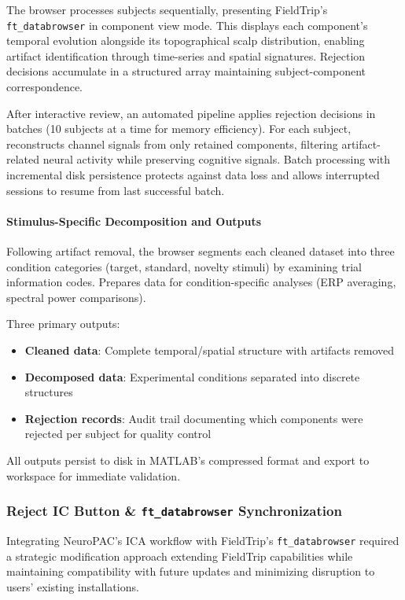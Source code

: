 \documentclass[12pt]{report}
\begin{document}
The browser processes subjects sequentially, presenting FieldTrip's \verb|ft_databrowser| in component view mode. This displays each component's temporal evolution alongside its topographical scalp distribution, enabling artifact identification through time-series and spatial signatures. Rejection decisions accumulate in a structured array maintaining subject-component correspondence.

After interactive review, an automated pipeline applies rejection decisions in batches (10 subjects at a time for memory efficiency). For each subject, reconstructs channel signals from only retained components, filtering artifact-related neural activity while preserving cognitive signals. Batch processing with incremental disk persistence protects against data loss and allows interrupted sessions to resume from last successful batch.

\paragraph{Stimulus-Specific Decomposition and Outputs}\mbox{}

Following artifact removal, the browser segments each cleaned dataset into three condition categories (target, standard, novelty stimuli) by examining trial information codes. Prepares data for condition-specific analyses (ERP averaging, spectral power comparisons).

Three primary outputs:
\begin{itemize}
\item \textbf{Cleaned data}: Complete temporal/spatial structure with artifacts removed
\item \textbf{Decomposed data}: Experimental conditions separated into discrete structures
\item \textbf{Rejection records}: Audit trail documenting which components were rejected per subject for quality control
\end{itemize}

All outputs persist to disk in MATLAB's compressed format and export to workspace for immediate validation.

\subsubsection{Reject IC Button \& \texttt{ft\_databrowser} Synchronization}

Integrating NeuroPAC's ICA workflow with FieldTrip's \verb|ft_databrowser| required a strategic modification approach extending FieldTrip capabilities while maintaining compatibility with future updates and minimizing disruption to users' existing installations.
\end{document}
